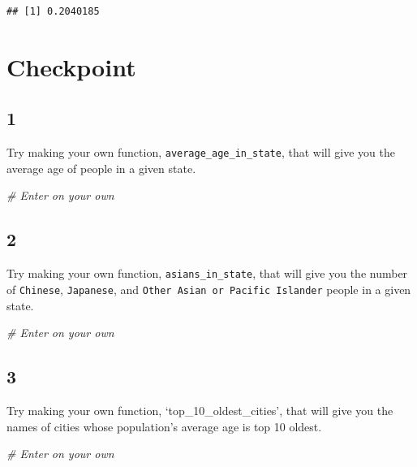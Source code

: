 \documentclass[
]{book}
\newenvironment{Shaded}{\begin{snugshade}}{\end{snugshade}}
\newcommand{\CommentTok}[1]{\textcolor[rgb]{0.56,0.35,0.01}{\textit{#1}}}
\theoremstyle{definition}
\theoremstyle{definition}
\theoremstyle{definition}
\theoremstyle{remark}
\begin{document}
\begin{verbatim}
## [1] 0.2040185
\end{verbatim}

\hypertarget{checkpoint-1}{%
\section*{Checkpoint}\label{checkpoint-1}}

\hypertarget{section-14}{%
\subsection*{1}\label{section-14}}

Try making your own function, \texttt{average\_age\_in\_state}, that will give you the average age of people in a given state.

\begin{Shaded}
\begin{Highlighting}[]
\CommentTok{\# Enter on your own}
\end{Highlighting}
\end{Shaded}

\hypertarget{section-15}{%
\subsection*{2}\label{section-15}}

Try making your own function, \texttt{asians\_in\_state}, that will give you the number of \texttt{Chinese}, \texttt{Japanese}, and \texttt{Other\ Asian\ or\ Pacific\ Islander} people in a given state.

\begin{Shaded}
\begin{Highlighting}[]
\CommentTok{\# Enter on your own}
\end{Highlighting}
\end{Shaded}

\hypertarget{section-16}{%
\subsection*{3}\label{section-16}}

Try making your own function, `top\_10\_oldest\_cities', that will give you the names of cities whose population's average age is top 10 oldest.

\begin{Shaded}
\begin{Highlighting}[]
\CommentTok{\# Enter on your own}
\end{Highlighting}
\end{Shaded}
\end{document}
